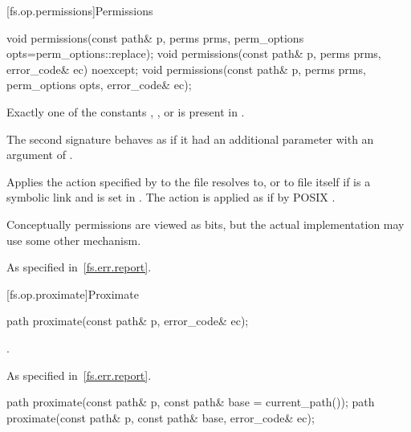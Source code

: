 [fs.op.permissions]{Permissions}

%
\begin{itemdecl}
void permissions(const path& p, perms prms, perm_options opts=perm_options::replace);
void permissions(const path& p, perms prms, error_code& ec) noexcept;
void permissions(const path& p, perms prms, perm_options opts, error_code& ec);
\end{itemdecl}

\begin{itemdescr}
\pnum
  \requires Exactly one of the  constants
  , , or  is present in .

\pnum
  \remarks The second signature behaves as if it had an additional parameter
    with an argument of .

\pnum
  \effects Applies the action specified by 
  to the file  resolves to,
  or to file  itself if  is a symbolic link
  and  is set in .
  The action is applied as if by POSIX .

\pnum
\begin{note} Conceptually permissions are viewed as bits, but the actual
  implementation may use some other mechanism. \end{note}

\pnum
\throws As specified in~\ref{fs.err.report}.
\end{itemdescr}

[fs.op.proximate]{Proximate}

%
\begin{itemdecl}
path proximate(const path& p, error_code& ec);
\end{itemdecl}

\begin{itemdescr}
\pnum
\returns {}.

\pnum
\throws As specified in~\ref{fs.err.report}.
\end{itemdescr}

%
\begin{itemdecl}
path proximate(const path& p, const path& base = current_path());
path proximate(const path& p, const path& base, error_code& ec);
\end{itemdecl}

